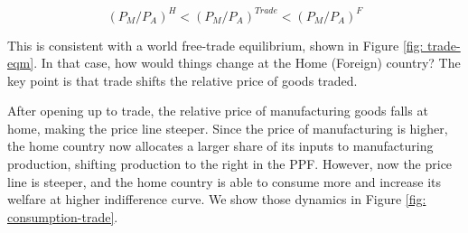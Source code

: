 \documentclass[11pt,letterpaper]{article}
\begin{document}
{\begin{equation*}
    (P_{M}/P_{A})^{H} < (P_{M}/P_{A})^{Trade} < (P_{M}/P_{A})^{F}
\end{equation*}

This is consistent with a world free-trade equilibrium, shown in Figure \eqref{fig: trade-eqm}. In that case, how would things change at the Home (Foreign) country? The key point is that trade shifts the relative price of goods traded.

After opening up to trade, the relative price of manufacturing goods falls at home, making the price line steeper. Since the price of manufacturing is higher, the home country now allocates a larger share of its inputs to manufacturing production, shifting production to the right in the PPF. However, now the price line is steeper, and the home country is able to consume more and increase its welfare at higher indifference curve. We show those dynamics in Figure \eqref{fig: consumption-trade}.


\begin{figure}
    \centering
\end{figure}}
\end{document}

